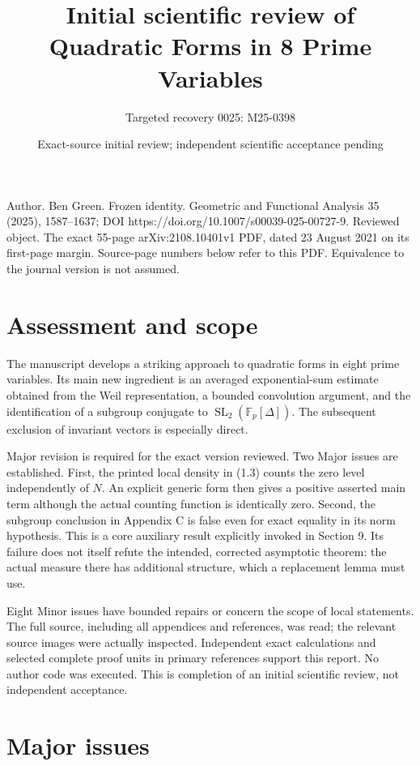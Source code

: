 \documentclass[10pt]{article}
\title{Initial scientific review of
Quadratic Forms in 8 Prime Variables}
\author{Targeted recovery 0025: M25-0398}
\date{Exact-source initial review; independent scientific acceptance pending}
\begin{document}
\maketitle
Author. Ben Green. Frozen identity. Geometric and Functional Analysis 35 (2025), 1587–1637; DOI https://doi.org/10.1007/s00039-025-00727-9. Reviewed object. The exact 55-page arXiv:2108.10401v1 PDF, dated 23 August 2021 on its first-page margin. Source-page numbers below refer to this PDF. Equivalence to the journal version is not assumed.\par
\section*{Assessment and scope}
The manuscript develops a striking approach to quadratic forms in eight prime variables. Its main new ingredient is an averaged exponential-sum estimate obtained from the Weil representation, a bounded convolution argument, and the identification of a subgroup conjugate to \(\operatorname{SL}_2(\mathbb F_p[\Delta])\). The subsequent exclusion of invariant vectors is especially direct.\par
Major revision is required for the exact version reviewed. Two Major issues are established. First, the printed local density in (1.3) counts the zero level independently of \(N\). An explicit generic form then gives a positive asserted main term although the actual counting function is identically zero. Second, the subgroup conclusion in Appendix C is false even for exact equality in its norm hypothesis. This is a core auxiliary result explicitly invoked in Section 9. Its failure does not itself refute the intended, corrected asymptotic theorem: the actual measure there has additional structure, which a replacement lemma must use.\par
Eight Minor issues have bounded repairs or concern the scope of local statements. The full source, including all appendices and references, was read; the relevant source images were actually inspected. Independent exact calculations and selected complete proof units in primary references support this report. No author code was executed. This is completion of an initial scientific review, not independent acceptance.\par
\section*{Major issues}
\end{document}
